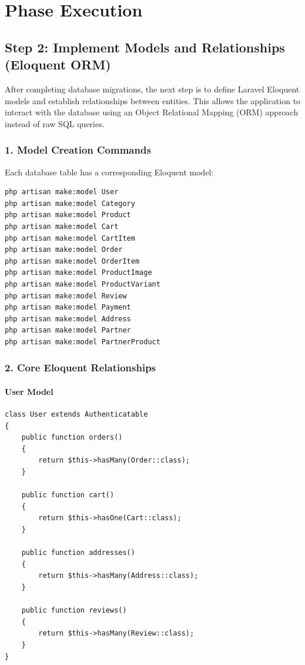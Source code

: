 \documentclass[12pt,a4paper]{article}
\begin{document}
\section{Phase Execution}

\subsection{Step 2: Implement Models and Relationships (Eloquent ORM)}

After completing database migrations, the next step is to define Laravel Eloquent models and establish relationships between entities. This allows the application to interact with the database using an Object Relational Mapping (ORM) approach instead of raw SQL queries.

\subsubsection{1. Model Creation Commands}

Each database table has a corresponding Eloquent model:

\begin{verbatim}
php artisan make:model User
php artisan make:model Category
php artisan make:model Product
php artisan make:model Cart
php artisan make:model CartItem
php artisan make:model Order
php artisan make:model OrderItem
php artisan make:model ProductImage
php artisan make:model ProductVariant
php artisan make:model Review
php artisan make:model Payment
php artisan make:model Address
php artisan make:model Partner
php artisan make:model PartnerProduct
\end{verbatim}

\subsubsection{2. Core Eloquent Relationships}

\paragraph{User Model}
\begin{verbatim}
class User extends Authenticatable
{
    public function orders()
    {
        return $this->hasMany(Order::class);
    }

    public function cart()
    {
        return $this->hasOne(Cart::class);
    }

    public function addresses()
    {
        return $this->hasMany(Address::class);
    }

    public function reviews()
    {
        return $this->hasMany(Review::class);
    }
}
\end{verbatim}
\end{document}
